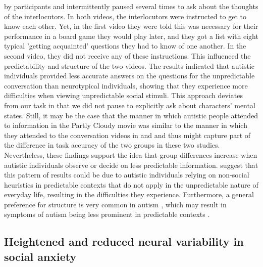 by participants and intermittently paused several times to ask about the thoughts of the interlocutors. In both videos, the interlocutors were instructed to get to know each other. Yet, in the first video they were told this was necessary for their performance in a board game they would play later, and they got a list with eight typical 'getting acquainted' questions they had to know of one another. In the second video, they did not receive any of these instructions. This influenced the predictability and structure of the two videos. The results indicated that autistic individuals provided less accurate answers on the questions for the unpredictable conversation than neurotypical individuals, showing that they experience more difficulties when viewing unpredictable social stimuli. This approach deviates from our task in that we did not pause to explicitly ask about characters' mental states. Still, it may be the case that the manner in which autistic people attended to information in the Partly Cloudy movie was similar to the manner in which they attended to the conversation videos in \cite{roeyers2001} and \cite{ponnet2008} and thus might capture part of the difference in task accuracy of the two groups in these two studies. Nevertheless, these findings support the idea that group differences increase when autistic individuals observe or decide on less predictable information. \cite{frith1994} suggest that this pattern of results could be due to autistic individuals relying on non-social heuristics in predictable contexts that do not apply in the unpredictable nature of everyday life, resulting in the difficulties they experience. Furthermore, a general preference for structure is very common in autism \citep{apa2013}, which may result in symptoms of autism being less prominent in predictable contexts \citep{howlin2004,mesibov1992}. 

\subsection{Heightened and reduced neural variability in social anxiety}

